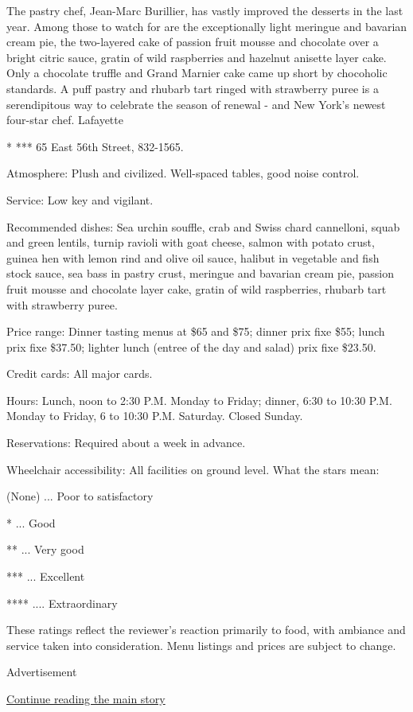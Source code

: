 The pastry chef, Jean-Marc Burillier, has vastly improved the desserts
in the last year. Among those to watch for are the exceptionally light
meringue and bavarian cream pie, the two-layered cake of passion fruit
mousse and chocolate over a bright citric sauce, gratin of wild
raspberries and hazelnut anisette layer cake. Only a chocolate truffle
and Grand Marnier cake came up short by chocoholic standards. A puff
pastry and rhubarb tart ringed with strawberry puree is a serendipitous
way to celebrate the season of renewal - and New York's newest four-star
chef. Lafayette

* *** 65 East 56th Street, 832-1565.

Atmosphere: Plush and civilized. Well-spaced tables, good noise control.

Service: Low key and vigilant.

Recommended dishes: Sea urchin souffle, crab and Swiss chard cannelloni,
squab and green lentils, turnip ravioli with goat cheese, salmon with
potato crust, guinea hen with lemon rind and olive oil sauce, halibut in
vegetable and fish stock sauce, sea bass in pastry crust, meringue and
bavarian cream pie, passion fruit mousse and chocolate layer cake,
gratin of wild raspberries, rhubarb tart with strawberry puree.

Price range: Dinner tasting menus at \$65 and \$75; dinner prix fixe
\$55; lunch prix fixe \$37.50; lighter lunch (entree of the day and
salad) prix fixe \$23.50.

Credit cards: All major cards.

Hours: Lunch, noon to 2:30 P.M. Monday to Friday; dinner, 6:30 to 10:30
P.M. Monday to Friday, 6 to 10:30 P.M. Saturday. Closed Sunday.

Reservations: Required about a week in advance.

Wheelchair accessibility: All facilities on ground level. What the stars
mean:

(None) ... Poor to satisfactory

* ... Good

** ... Very good

*** ... Excellent

**** .... Extraordinary

These ratings reflect the reviewer's reaction primarily to food, with
ambiance and service taken into consideration. Menu listings and prices
are subject to change.

Advertisement

\protect\hyperlink{after-bottom}{Continue reading the main story}

